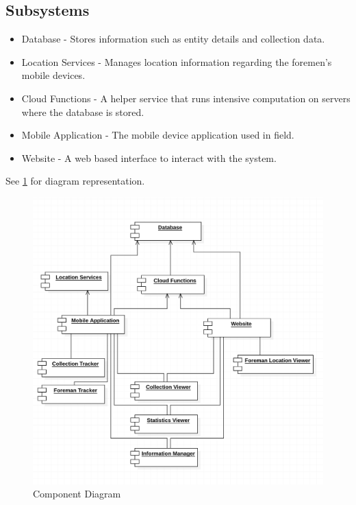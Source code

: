 \documentclass[11pt]{article}
\begin{document}
\subsection{Subsystems}
\begin{itemize}
\item Database - Stores information such as entity details and collection data.
\item Location Services - Manages location information regarding the foremen's mobile devices.
\item Cloud Functions - A helper service that runs intensive computation on servers where the database is stored.
\item Mobile Application - The mobile device application used in field.
\item Website - A web based interface to interact with the system.
\end{itemize}
See \ref{ComponentDiagram} for diagram representation.
\begin{figure}
 \centering
 \includegraphics[width=12cm, keepaspectratio]{ComponentDiagram.png}
 \caption{Component Diagram}
 \label{ComponentDiagram}
\end{figure}
\end{document}
